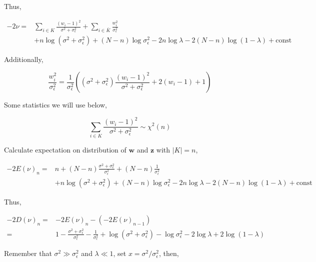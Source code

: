 Thus, 

\begin{equation}
\begin{aligned}
    -2\nu =& \sum_{i\in K}\frac{(w_i - 1)^2}{\sigma^2+\sigma_\epsilon^2} + \sum_{i\in \bar{K}}\frac{w_i^2}{\sigma_\epsilon^2} \\ 
    &+ n\log(\sigma^2+\sigma_\epsilon^2) + (N-n)\log\sigma_\epsilon^2 - 2n\log\lambda - 2(N-n)\log(1-\lambda) + \mathrm{const}
\end{aligned}
\end{equation}

Additionally, 

\begin{equation}
    \frac{w_i^2}{\sigma_\epsilon^2} = \frac{1}{\sigma_\epsilon^2}((\sigma^2+\sigma_\epsilon^2)\frac{(w_i - 1)^2}{\sigma^2+\sigma_\epsilon^2} + 2(w_i - 1) + 1)
\end{equation}

Some statistics we will use below,

\begin{equation}
    \sum_{i\in K}\frac{(w_i - 1)^2}{\sigma^2+\sigma_\epsilon^2} \sim \chi^2(n)
\end{equation}

Calculate expectation on distribution of $\bm{w}$ and $\bm{z}$ with $|K|=n$, 

\begin{equation}
\begin{aligned}
    -2E(\nu)_n =& n + (N - n)\frac{\sigma^2+\sigma_\epsilon^2}{\sigma_\epsilon^2} + (N - n)\frac{1}{\sigma_\epsilon^2} \\ 
    &+ n\log(\sigma^2+\sigma_\epsilon^2) + (N-n)\log\sigma_\epsilon^2 - 2n\log\lambda - 2(N-n)\log(1-\lambda) + \mathrm{const}
\end{aligned}
\end{equation}

Thus, 

\begin{equation}
\begin{aligned}
    -2D(\nu)_n =& -2E(\nu)_n - (-2E(\nu)_{n-1}) \\ 
    =& 1 - \frac{\sigma^2+\sigma_\epsilon^2}{\sigma_\epsilon^2} - \frac{1}{\sigma_\epsilon^2} + \log(\sigma^2+\sigma_\epsilon^2) - \log\sigma_\epsilon^2 - 2\log\lambda + 2\log(1-\lambda)
\end{aligned}
\end{equation}

Remember that $\sigma^2 \gg \sigma_\epsilon^2$ and $\lambda \ll 1$, set $x=\sigma^2/\sigma_\epsilon^2$, then,


